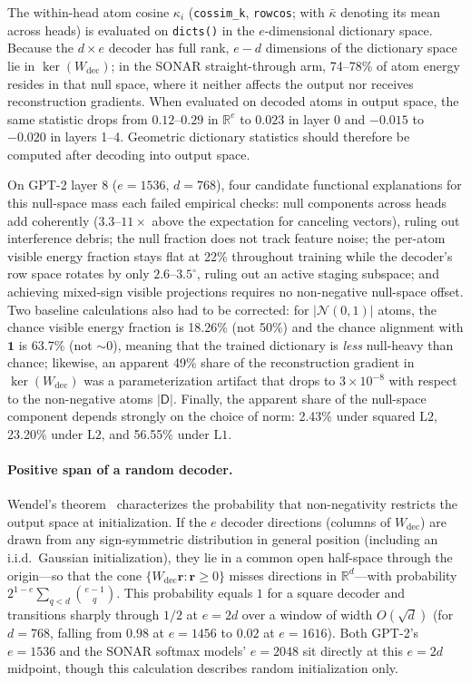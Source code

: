 The within-head atom cosine $\kappa_i$ (\texttt{cossim\_k},
\texttt{rowcos}; with $\bar\kappa$ denoting its mean across heads) is
evaluated on \texttt{dicts()} in the $e$-dimensional dictionary space.
Because the $d\times e$ decoder has full rank, $e-d$ dimensions of the
dictionary space lie in $\ker(W_{\mathrm{dec}})$; in the SONAR
straight-through arm, 74--78\% of atom energy resides in that null space,
where it neither affects the output nor receives reconstruction gradients.
When evaluated on decoded atoms in output space, the same statistic drops
from $0.12$--$0.29$ in $\mathbb{R}^e$ to $0.023$ in layer 0 and $-0.015$
to $-0.020$ in layers 1--4. Geometric dictionary statistics should
therefore be computed after decoding into output space.

On GPT-2 layer 8 ($e{=}1536$, $d{=}768$), four candidate functional
explanations for this null-space mass each failed empirical checks: null
components across heads add coherently ($3.3$--$11\times$ above the
expectation for canceling vectors), ruling out interference debris; the
null fraction does not track feature noise; the per-atom visible energy
fraction stays flat at 22\% throughout training while the decoder's row
space rotates by only $2.6$--$3.5^\circ$, ruling out an active staging
subspace; and achieving mixed-sign visible projections requires no
non-negative null-space offset. Two baseline calculations also had to be
corrected: for $\lvert\mathcal{N}(0,1)\rvert$ atoms, the chance visible
energy fraction is 18.26\% (not 50\%) and the chance alignment with
$\mathbf{1}$ is 63.7\% (not ${\sim}0$), meaning that the trained
dictionary is \emph{less} null-heavy than chance; likewise,
an apparent 49\% share of the reconstruction gradient in
$\ker(W_{\mathrm{dec}})$ was a parameterization artifact that drops to
$3\times10^{-8}$ with respect to the non-negative atoms
$\lvert\mathsf{D}\rvert$. Finally, the apparent share of the null-space
component depends strongly on the choice of norm: 2.43\% under squared
$\mathrm{L2}$, 23.20\% under $\mathrm{L2}$, and 56.55\% under
$\mathrm{L1}$.

\paragraph{Positive span of a random decoder.} Wendel's
theorem~\cite{wendel1962} characterizes the probability that
non-negativity restricts the output space at initialization. If the $e$
decoder directions (columns of $W_{\mathrm{dec}}$) are drawn from any
sign-symmetric distribution in general position (including an i.i.d.\
Gaussian initialization), they lie in a common open half-space through the
origin---so that the cone $\{W_{\mathrm{dec}}\mathbf{r} : \mathbf{r}\geq0\}$
misses directions in $\mathbb{R}^d$---with probability
$2^{1-e}\sum_{q<d}\binom{e-1}{q}$. This probability equals $1$ for a
square decoder and transitions sharply through $1/2$ at $e{=}2d$ over a
window of width $O(\sqrt{d})$ (for $d{=}768$, falling from $0.98$ at
$e{=}1456$ to $0.02$ at $e{=}1616$). Both GPT-2's $e{=}1536$ and the SONAR
softmax models' $e{=}2048$ sit directly at this $e{=}2d$ midpoint, though
this calculation describes random initialization only.

